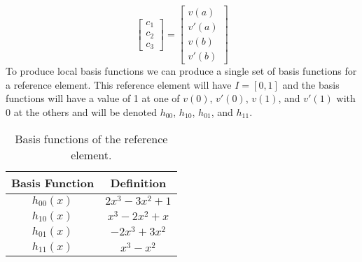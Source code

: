 \documentclass{article}
\begin{document}
\begin{enumerate}
\begin{enumerate}
{\begin{equation*}
\begin{bmatrix}
			c_1 \\
			c_2 \\
			c_3
		\end{bmatrix} =
		\begin{bmatrix}
			v(a) \\
			v'(a) \\
			v(b) \\
			v'(b)
		\end{bmatrix}
	\end{equation*}
	To produce local basis functions we can produce a single set of basis functions for a reference element.
	This reference element will have $I = [0,1]$ and the basis functions will have a value of 1 at one of
	$v(0)$, $v'(0)$, $v(1)$, and $v'(1)$ with 0 at the others and will be denoted
	$h_{00}$, $h_{10}$, $h_{01}$, and $h_{11}$.
	\begin{table}[h]
		\caption{Basis functions of the reference element.}
		\label{tab:hbasis}
		\centering
	
		\begin{tabular}{c|c}
		\hline
	
		\hline
		\textbf{Basis Function} & \textbf{Definition} \\
		\hline
			$h_{00}(x)$ & $2x^3 - 3x^2 + 1$ \\
			$h_{10}(x)$ & $x^3 - 2x^2 + x$ \\
			$h_{01}(x)$ & $-2x^3 + 3x^2$ \\
			$h_{11}(x)$ & $x^3 - x^2$ \\
		\hline
	

\end{tabular}
\end{table}}
\end{enumerate}
\end{enumerate}
\end{document}
